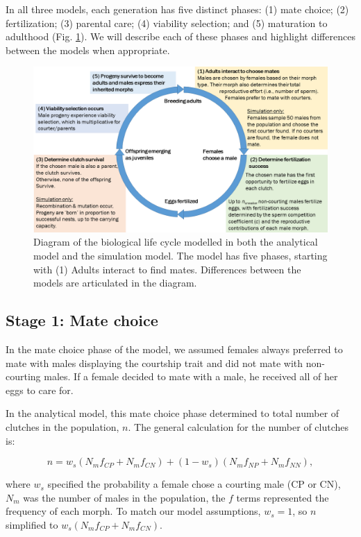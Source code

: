 \documentclass[
  11pt,
  a4paper,
]{article}
\begin{document}
In all three models, each generation has five distinct phases: (1) mate
choice; (2) fertilization; (3) parental care; (4) viability selection;
and (5) maturation to adulthood (Fig. \ref{fig:modelDiagram}). We will
describe each of these phases and highlight differences between the
models when appropriate.

\begin{figure}[H]
\includegraphics[width=1\linewidth,]{../figs/lifecycle_biology} \caption{Diagram of the biological life cycle modelled in both the analytical model and the simulation model. The model has five phases, starting with (1) Adults interact to find mates. Differences between the models are articulated in the diagram.}\label{fig:modelDiagram}
\end{figure}

\hypertarget{stage-1-mate-choice}{%
\subsection{Stage 1: Mate choice}\label{stage-1-mate-choice}}

In the mate choice phase of the model, we assumed females always
preferred to mate with males displaying the courtship trait and did not
mate with non-courting males. If a female decided to mate with a male,
he received all of her eggs to care for.

In the analytical model, this mate choice phase determined to total
number of clutches in the population, \(n\). The general calculation for
the number of clutches is:

\[
n=w_s(N_m f_{CP} + N_m f_{CN}) + (1-w_s)(N_m f_{NP} + N_m f_{NN}), 
\]

where \(w_s\) specified the probability a female chose a courting male (CP
or CN), \(N_m\) was the number of males in the population, the \(f\) terms
represented the frequency of each morph. To match our model assumptions,
\(w_s=1\), so \(n\) simplified to \(w_s(N_m f_{CP} + N_m f_{CN})\).
\end{document}
